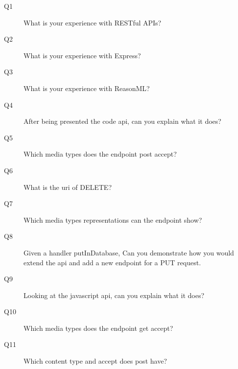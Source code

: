 \begin{description}
    \item[Q1] What is your experience with RESTful APIs?
    \item[Q2] What is your experience with Express?
    \item[Q3] What is your experience with ReasonML?
    \item[Q4] After being presented the code api, can you explain what it does?
    \item[Q5] Which media types does the endpoint post accept?
    \item[Q6] What is the uri of DELETE?
    \item[Q7] Which media types representations can the endpoint show?
    \item[Q8] Given a handler putInDatabase, Can you demonstrate how you would
        extend the api and add a new endpoint for a PUT request.
    \item[Q9] Looking at the javascript api, can you explain what it does?
    \item[Q10] Which media types does the endpoint get accept?
    \item[Q11] Which content type and accept does post have?
\end{description}


